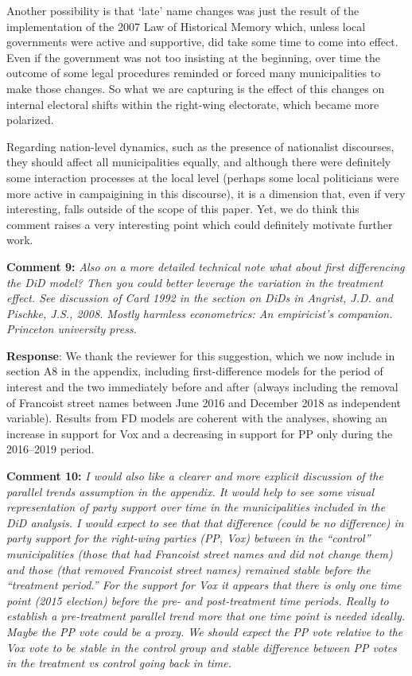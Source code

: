 \documentclass[12pt, a4paper, notitlepage]{article}
\begin{document}
Another possibility is that `late' name changes was just the result of the implementation of the 2007 Law of Historical Memory which, unless local governments were active and supportive, did take some time to come into effect.
Even if the government was not too insisting at the beginning, over time the outcome of some legal procedures reminded or forced many municipalities to make those changes.
So what we are capturing is the effect of this changes on internal electoral shifts within the right-wing electorate, which became more polarized.

Regarding nation-level dynamics, such as the presence of nationalist discourses, they should affect all municipalities equally, and although there were definitely some interaction processes at the local level (perhaps some local politicians were more active in campaigining in this discourse), it is a dimension that, even if very interesting, falls outside of the scope of this paper.
Yet, we do think this comment raises a very interesting point which could definitely motivate further work.

\textbf{Comment 9:} \textit{Also on a more detailed technical note what about first differencing the DiD model? Then you could better leverage the variation in the treatment effect. See discussion of Card 1992 in the section on DiDs in Angrist, J.D. and Pischke, J.S., 2008. Mostly harmless econometrics: An empiricist's companion. Princeton university press.}

\textbf{Response}: We thank the reviewer for this suggestion, which we now include in section A8 in the appendix, including first-difference models for the period of interest and the two immediately before and after (always including the removal of Francoist street names between June 2016 and December 2018 as independent variable). Results from FD models are coherent with the analyses, showing an increase in support for Vox and a decreasing in support for PP only during the 2016--2019 period.

\textbf{Comment 10:} \textit{I would also like a clearer and more explicit discussion of the parallel trends assumption in the appendix. It would help to see some visual representation of party support over time in the municipalities included in the DiD analysis. I would expect to see that that difference (could be no difference) in party support for the right-wing parties (PP, Vox) between in the “control” municipalities (those that had Francoist street names and did not change them) and those (that removed Francoist street names) remained stable before the “treatment period.”
For the support for Vox it appears that there is only one time point (2015 election) before the pre- and post-treatment time periods. Really to establish a pre-treatment parallel trend more that one time point is needed ideally. Maybe the PP vote could be a proxy. We should expect the PP vote relative to the Vox vote to be stable in the control group and stable difference between PP votes in the treatment vs control going back in time.}
\end{document}
